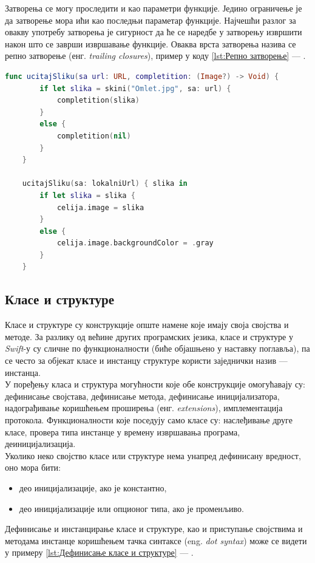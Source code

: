 \documentclass[12pt,oneside]{memoir}
\begin{document}
\indent Затворења се могу проследити и као параметри функције. Једино ограничење је да затворење мора ићи као последњи параметар функције. Најчешћи разлог за овакву употребу затворења је сигурност да ће се наредбе у затворењу извршити након што се заврши извршавање функције. Оваква врста затворења назива се репно затворење (енг. \textit{trailing closures}), пример у коду \ref{lst:Репно затворење} --- .

\begin{lstlisting}[caption=\textit{{Репно затворење}}, label={lst:Репно затворење}, language=Swift, frame=single]
    func ucitajSliku(sa url: URL, completition: (Image?) -> Void) {
        if let slika = skini("Omlet.jpg", sa: url) {
            completition(slika)
        }
        else {
            completition(nil)
        }
    }
    
    ucitajSliku(sa: lokalniUrl) { slika in
        if let slika = slika {
            celija.image = slika
        }
        else {
            celija.image.backgroundColor = .gray
        }
    }
\end{lstlisting}

\subsection{Класе и структуре}

\indent Класе и структуре су конструкције опште намене које имају своја својства и методе. За разлику од већине других програмских језика, класе и структуре у \textit{Swift}-у су сличне по функционалности (биће објашњено у наставку поглавља), па се често за објекат класе и инстанцу структуре користи заједнички назив --- инстанца. 
\\
\indent У поређењу класа и структура могућности које обе конструкције омогућавају су: дефинисање својстава, дефинисање метода, дефинисање иницијализатора, надограђивање коришћењем проширења (енг. \textit{extensions}), имплементација протокола. Функционалности које поседују само класе су: наслеђивање друге класе, провера типа инстанце у времену извршавања програма, деиницијализација.
\\
\indent Уколико неко својство класе или структуре нема унапред дефинисану вредност, оно мора бити: 
\begin{itemize}
    \item део иницијализације, ако је константно,
    \item део иницијализације или опционог типа, ако је променљиво.
\end{itemize}
Дефинисање и инстанцирање класе и структуре, као и приступање својствима и методама инстанце коришћењем тачка синтаксе (eng. \textit{dot syntax}) може се видети у примеру \ref{lst:Дефинисање класе и структуре} --- .
\end{document}
